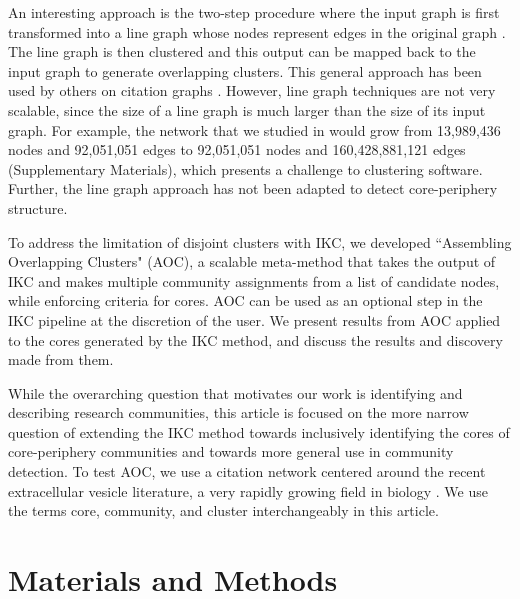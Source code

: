 \documentclass[12pt, oneside]{article}   	%
\begin{document}
An interesting approach is the two-step procedure where the input graph is first transformed into a line graph whose nodes represent edges in the original graph \citep{Harary1960}.  The line graph is then clustered and this output can be mapped back to the input graph to generate overlapping clusters. This general approach has been used by others on citation graphs \citep{Evans2009,Havemann2021}. However, line graph  techniques are not very scalable, since the size of a line graph is much larger than the size of its input graph. For example, the network that we studied in \cite{Wedell2022} would grow from 13,989,436 nodes and 92,051,051 edges to 92,051,051 nodes and 160,428,881,121 edges (Supplementary Materials), which presents a challenge to clustering software. Further, the line graph approach has not been adapted to detect core-periphery structure.
	
To address the limitation of disjoint clusters with IKC, we developed  ``Assembling Overlapping Clusters" (AOC), a scalable meta-method that takes the output of IKC and makes multiple community assignments from a list of candidate nodes, while enforcing criteria for cores. AOC can be used as an optional step in the IKC pipeline at the discretion of the user. We present results from AOC applied to the cores generated by the IKC method, and discuss the results and discovery made from them. 
	
While the overarching question that motivates our work is identifying and describing research communities, this article is focused on the more narrow question of extending the IKC method towards inclusively identifying the cores of core-periphery communities and towards more general use in community detection. To test AOC, we use a citation network centered around the recent extracellular vesicle literature, a very rapidly growing field in biology \citep{van2022challenges}. We use the terms core, community, and cluster interchangeably in this article.

\section{Materials and Methods}
	
\end{document}
